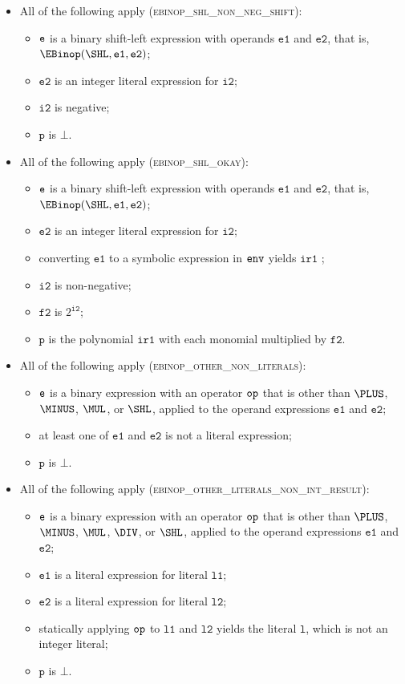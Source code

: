 \documentclass{book}
\newcommand\vitwo[0]{\texttt{i2}}
\newcommand\vftwo[0]{\texttt{f2}}
\newcommand\vl[0]{\texttt{l}}
\newcommand\vp[0]{\texttt{p}}
\newcommand\veone[0]{\texttt{e1}}
\newcommand\vetwo[0]{\texttt{e2}}
\newcommand\irone[0]{\texttt{ir1}}
\newcommand\vlone[0]{\texttt{l1}}
\newcommand\vltwo[0]{\texttt{l2}}
\begin{document}
\begin{itemize}
  \item All of the following apply (\textsc{ebinop\_shl\_non\_neg\_shift}):
  \begin{itemize}
    \item $\texttt{e}$ is a binary shift-left expression with operands $\veone$ and $\vetwo$, that is, \\ $\EBinop(\SHL, \veone, \vetwo)$;
    \item $\vetwo$ is an integer literal expression for $\vitwo$;
    \item $\vitwo$ is negative;
    \item $\vp$ is $\bot$.
  \end{itemize}

  \item All of the following apply (\textsc{ebinop\_shl\_okay}):
  \begin{itemize}
    \item $\texttt{e}$ is a binary shift-left expression with operands $\veone$ and $\vetwo$, that is, \\ $\EBinop(\SHL, \veone, \vetwo)$;
    \item $\vetwo$ is an integer literal expression for $\vitwo$;
    \item converting $\veone$ to a symbolic expression in $\texttt{env}$ yields $\irone$ \ProseOrTypeErrorOrBot;
    \item $\vitwo$ is non-negative;
    \item $\vftwo$ is $2^{\vitwo}$;
    \item $\vp$ is the polynomial $\irone$ with each monomial multiplied by $\vftwo$.
  \end{itemize}

  \item All of the following apply (\textsc{ebinop\_other\_non\_literals}):
  \begin{itemize}
    \item $\texttt{e}$ is a binary expression with an operator $\texttt{op}$ that is other than $\PLUS$, $\MINUS$, $\MUL$, or $\SHL$,
          applied to the operand expressions $\veone$ and $\vetwo$;
    \item at least one of $\veone$ and $\vetwo$ is not a literal expression;
    \item $\vp$ is $\bot$.
  \end{itemize}

  \item All of the following apply (\textsc{ebinop\_other\_literals\_non\_int\_result}):
  \begin{itemize}
    \item $\texttt{e}$ is a binary expression with an operator $\texttt{op}$ that is other than $\PLUS$, $\MINUS$, $\MUL$, $\DIV$, or $\SHL$,
          applied to the operand expressions $\veone$ and $\vetwo$;
    \item $\veone$ is a literal expression for literal $\vlone$;
    \item $\vetwo$ is a literal expression for literal $\vltwo$;
    \item statically applying $\texttt{op}$ to $\vlone$ and $\vltwo$ yields the literal $\vl$, which is not an integer literal;
    \item $\vp$ is $\bot$.
  \end{itemize}


\end{itemize}
\end{document}
